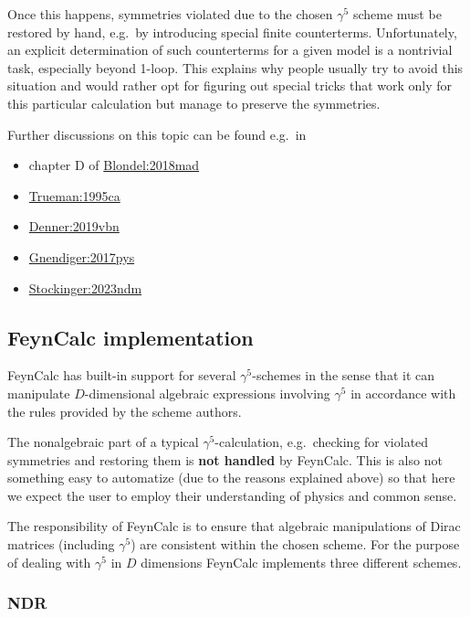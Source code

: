 \documentclass[../FeynCalcManual.tex]{subfiles}
\begin{document}
Once this happens, symmetries violated due to the chosen \(\gamma^5\)
scheme must be restored by hand, e.g.~by introducing special finite
counterterms. Unfortunately, an explicit determination of such
counterterms for a given model is a nontrivial task, especially beyond
1-loop. This explains why people usually try to avoid this situation and
would rather opt for figuring out special tricks that work only for this
particular calculation but manage to preserve the symmetries.

Further discussions on this topic can be found e.g.~in

\begin{itemize}
\tightlist
\item
  chapter D of \href{https://arxiv.org/pdf/1809.01830}{Blondel:2018mad}
\item
  \href{https://arxiv.org/pdf/hep-ph/9504315.pdf}{Trueman:1995ca}
\item
  \href{https://arxiv.org/pdf/1912.06823.pdf}{Denner:2019vbn}
\item
  \href{https://arxiv.org/abs/1705.01827}{Gnendiger:2017pys}
\item
  \href{https://arxiv.org/abs/2312.11291}{Stockinger:2023ndm}
\end{itemize}

\subsection{FeynCalc implementation}\label{feyncalc-implementation}

FeynCalc has built-in support for several \(\gamma^5\)-schemes in the
sense that it can manipulate \(D\)-dimensional algebraic expressions
involving \(\gamma^5\) in accordance with the rules provided by the
scheme authors.

The nonalgebraic part of a typical \(\gamma^5\)-calculation,
e.g.~checking for violated symmetries and restoring them is \textbf{not
handled} by FeynCalc. This is also not something easy to automatize (due
to the reasons explained above) so that here we expect the user to
employ their understanding of physics and common sense.

The responsibility of FeynCalc is to ensure that algebraic manipulations
of Dirac matrices (including \(\gamma^5\)) are consistent within the
chosen scheme. For the purpose of dealing with \(\gamma^5\) in \(D\)
dimensions FeynCalc implements three different schemes.

\subsubsection{NDR}\label{ndr}
\end{document}
